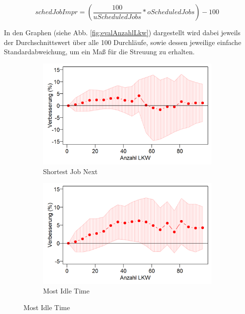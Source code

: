 \begin{equation} \label{eq:schedJobImpr}
schedJobImpr = \left(\dfrac{100}{uScheduledJobs} * oScheduledJobs\right) - 100
\end{equation}

In den Graphen (siehe Abb. \ref{fig:evalAnzahlLkw}) dargestellt wird dabei jeweils der Durchschnittswert über alle 100 Durchläufe, sowie dessen jeweilige einfache Standardabweichung, um ein Maß für die Streuung zu erhalten.

\begin{figure}[H]
\centering
\begin{subfigure}{.495\textwidth}
  \centering
  \includegraphics[width=\linewidth]{images/graphs/rsNumberOfTrucksSjn_AnzahlAbgefertigt.png}
  \caption{Shortest Job Next}
  \label{fig:eal1}
\end{subfigure}
\begin{subfigure}{.495\textwidth}
  \centering
  \includegraphics[width=\linewidth]{images/graphs/rsNumberOfTrucksMot_AnzahlAbgefertigt.png}
  \caption{Most Idle Time}
  \label{fig:eal2}
\end{subfigure}


\end{figure}
